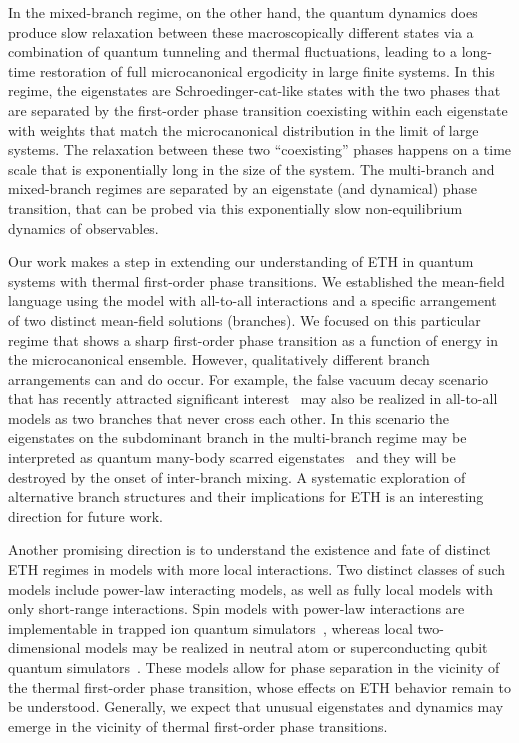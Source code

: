 \documentclass[aps,prx,showpacs,amsmath,amssymb,superscriptaddress,twocolumn,longbibliography,10pt,nofootinbib]{revtex4-2}
\begin{document}
In the mixed-branch regime, on the other hand, the quantum dynamics does produce slow relaxation between these macroscopically different states via a combination of quantum tunneling and thermal fluctuations, leading to a long-time restoration of full microcanonical ergodicity in large finite systems.  In this regime, the eigenstates are Schroedinger-cat-like states with the two phases that are separated by the first-order phase transition coexisting within each eigenstate with weights that match the microcanonical distribution in the limit of large systems.  The relaxation between these two ``coexisting'' phases happens on a time scale that is exponentially long in the size of the system. The multi-branch and mixed-branch regimes are separated by an eigenstate (and dynamical) phase transition, that can be probed via this exponentially slow non-equilibrium dynamics of observables. 

Our work makes a step in extending our understanding of ETH in quantum systems with thermal first-order phase transitions.  We established the mean-field language using the model with all-to-all interactions and a specific arrangement of two distinct mean-field solutions (branches). We focused on this particular regime that shows a sharp first-order phase transition as a function of energy in the microcanonical ensemble. However, qualitatively different branch arrangements can and do occur. For example, the false vacuum decay scenario that has recently attracted significant interest~\cite{Moss19,Spannowsky21,Ng21,Calabrese21,Papic25} may also be realized in all-to-all models as two branches that never cross each other.  In this scenario the eigenstates on the subdominant branch in the multi-branch regime may be interpreted as quantum many-body scarred eigenstates~\cite{Serbyn:2021vc} and they will be destroyed by the onset of inter-branch mixing.  A systematic exploration of alternative branch structures and their implications for ETH is an interesting direction for future work.

Another promising direction is to understand the existence and fate of distinct ETH regimes in models with more local interactions. Two distinct classes of such models include power-law interacting models, as well as fully local models with only short-range interactions.  Spin models with power-law interactions are implementable in trapped ion quantum simulators~\cite{Blatt12}, whereas local two-dimensional models may be realized in neutral atom or superconducting qubit quantum simulators~\cite{Devoret13}. These models allow for phase separation in the vicinity of the thermal first-order phase transition, whose effects on ETH behavior remain to be understood. Generally, we expect that unusual eigenstates and  dynamics may emerge  in the vicinity of thermal first-order phase transitions. 
\end{document}
